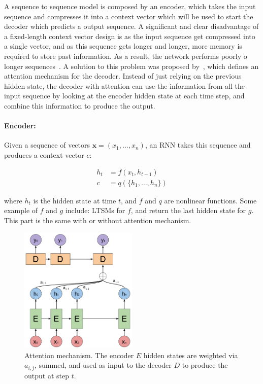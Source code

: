A sequence to sequence model is composed by an encoder, which takes the input sequence and compresses it into a context vector which will be used to start the decoder which predicts a output sequence.  A significant and clear disadvantage of a fixed-length context vector design is as the input sequence get compressed into a single vector, and as this sequence gets longer and longer, more memory is required to store past information. As a result, the network performs poorly o longer sequences~\citep{cho-etal-2014-properties}. A solution to this problem was proposed by~\cite{bahdanau2014neural}, which defines an attention mechanism for the decoder. Instead of just relying on the previous hidden state, the decoder with attention can use the information from all the input sequence by looking at the encoder hidden state at each time step, and combine this information to produce the output.

\paragraph{Encoder:} Given a sequence of vectors $\textbf{x} = (x_1, \dots, x_n)$, an RNN takes this sequence and produces a context vector $c$:

\begin{equation}
    \begin{split}
        h_t & = f(x_t, h_{t-1})\\
        c & = q(\{h_1, \dots, h_n\}) 
    \end{split}
\end{equation}

where $h_t$ is the hidden state at time $t$, and $f$ and $q$ are nonlinear functions. Some example of $f$ and $g$ include: LTSMs for $f$, and return the last hidden state for $g$. This part is the same with or without attention mechanism.

\begin{figure}[t]
        \centering
        \includegraphics[width=0.5\textwidth]{images/Attention.pdf}
        \caption{Attention mechanism. The encoder $E$ hidden states are weighted via $a_{i, j}$, summed, and used as input to the decoder $D$ to produce the output at step $t$.}
        \label{fig:attention}
\end{figure}%

